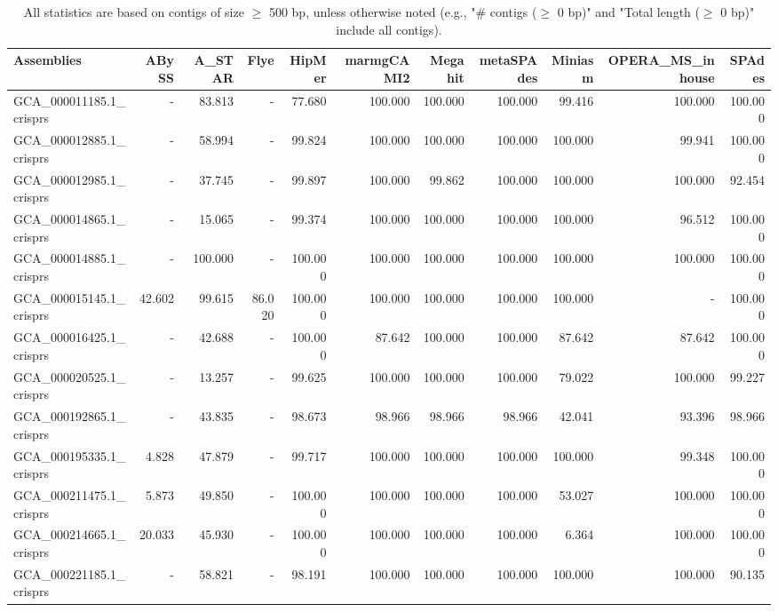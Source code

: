 \documentclass[12pt,a4paper]{article}
\begin{document}
\begin{table}[ht]
\begin{center}
\caption{All statistics are based on contigs of size $\geq$ 500 bp, unless otherwise noted (e.g., "\# contigs ($\geq$ 0 bp)" and "Total length ($\geq$ 0 bp)" include all contigs).}
\begin{tabular}{|l*{10}{|r}|}
\hline
Assemblies & ABySS & A\_STAR & Flye & HipMer & marmgCAMI2 & Megahit & metaSPAdes & Miniasm & OPERA\_MS\_inhouse & SPAdes \\ \hline
GCA\_000011185.1\_crisprs & - & 83.813 & - & 77.680 & 100.000 & 100.000 & 100.000 & 99.416 & 100.000 & 100.000 \\ \hline
GCA\_000012885.1\_crisprs & - & 58.994 & - & 99.824 & 100.000 & 100.000 & 100.000 & 100.000 & 99.941 & 100.000 \\ \hline
GCA\_000012985.1\_crisprs & - & 37.745 & - & 99.897 & 100.000 & 99.862 & 100.000 & 100.000 & 100.000 & 92.454 \\ \hline
GCA\_000014865.1\_crisprs & - & 15.065 & - & 99.374 & 100.000 & 100.000 & 100.000 & 100.000 & 96.512 & 100.000 \\ \hline
GCA\_000014885.1\_crisprs & - & 100.000 & - & 100.000 & 100.000 & 100.000 & 100.000 & 100.000 & 100.000 & 100.000 \\ \hline
GCA\_000015145.1\_crisprs & 42.602 & 99.615 & 86.020 & 100.000 & 100.000 & 100.000 & 100.000 & 100.000 & - & 100.000 \\ \hline
GCA\_000016425.1\_crisprs & - & 42.688 & - & 100.000 & 87.642 & 100.000 & 100.000 & 87.642 & 87.642 & 100.000 \\ \hline
GCA\_000020525.1\_crisprs & - & 13.257 & - & 99.625 & 100.000 & 100.000 & 100.000 & 79.022 & 100.000 & 99.227 \\ \hline
GCA\_000192865.1\_crisprs & - & 43.835 & - & 98.673 & 98.966 & 98.966 & 98.966 & 42.041 & 93.396 & 98.966 \\ \hline
GCA\_000195335.1\_crisprs & 4.828 & 47.879 & - & 99.717 & 100.000 & 100.000 & 100.000 & 100.000 & 99.348 & 100.000 \\ \hline
GCA\_000211475.1\_crisprs & 5.873 & 49.850 & - & 100.000 & 100.000 & 100.000 & 100.000 & 53.027 & 100.000 & 100.000 \\ \hline
GCA\_000214665.1\_crisprs & 20.033 & 45.930 & - & 100.000 & 100.000 & 100.000 & 100.000 & 6.364 & 100.000 & 100.000 \\ \hline
GCA\_000221185.1\_crisprs & - & 58.821 & - & 98.191 & 100.000 & 100.000 & 100.000 & 100.000 & 100.000 & 90.135 \\ \hline

\end{tabular}
\end{center}
\end{table}
\end{document}
